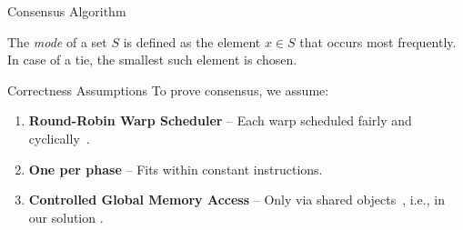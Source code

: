\documentclass{beamer}
\begin{document}

\begin{frame}{Consensus Algorithm}

\vspace{0.8em}

{\scriptsize
The \textit{mode} of a set \( S \) is defined as the element \( x \in S \) that occurs most frequently. 
In case of a tie, the smallest such element is chosen.
}
\end{frame}


\begin{frame}{Correctness Assumptions}
To prove consensus, we assume:
\begin{enumerate}
  \item \textbf{Round-Robin Warp Scheduler}  
  – Each warp scheduled fairly and cyclically~.
  \item \textbf{One \Fwrite{} per phase}  
  – Fits within constant instructions.
  \item \textbf{Controlled Global Memory Access}  
  – Only via shared objects~, i.e., in our solution  \BVCAS.
\end{enumerate}
\end{frame}
\end{document}
